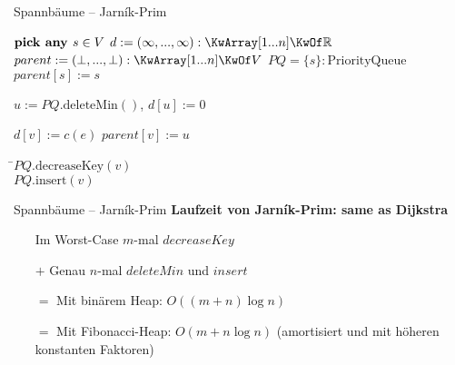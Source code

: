 \begin{frame}{Spannbäume – Jarník-Prim}
	\vspace{-.4\baselineskip}
	\begin{exampleblock}{}
		\vspace{-.4\baselineskip}
		\begin{algorithm}[H]
			\small							
			 {
				$\KwSty{pick any } s \in V$\;
				$d := (\infty, ..., \infty) : \KwArray[1...n] \KwOf \R$   \;
				$parent := (\bot, ..., \bot) : \KwArray[1...n] \KwOf V$\;
				$PQ = \{s\} : \text{PriorityQueue}$\;
				$parent[s] := s$ \;
				 {
					$u := PQ.\text{deleteMin}()$, \quad $d[u] := 0$ \;
					 {
						 {
							$d[v] := c(e)$\;
							$parent[v] := u$\;
							\begin{tabbing}
								 {
									\=$PQ.\text{decreaseKey}(v)$ \\
								} {
									\>$PQ.\text{insert}(v)$
								} 
							\end{tabbing}
							\vspace{-\baselineskip}
						}
					}
				}
			\;
			}
		\end{algorithm}
	\end{exampleblock}
\end{frame}



\begin{frame}{Spannbäume – Jarník-Prim}
	\textbf{Laufzeit von Jarník-Prim: same as Dijkstra} 
	\begin{itemize}
		\item[] Im Worst-Case $m$-mal $decreaseKey$
		\item[$+$] Genau $n$-mal $deleteMin$ und $insert$
		\pause
		\item[$=$] Mit binärem Heap: $O\left((m+n)\log n\right)$
		\pause
		\item[$=$] Mit Fibonacci-Heap: $O(m + n \log n)$ \quad (amortisiert und mit höheren konstanten Faktoren)
	\end{itemize}
\end{frame}

